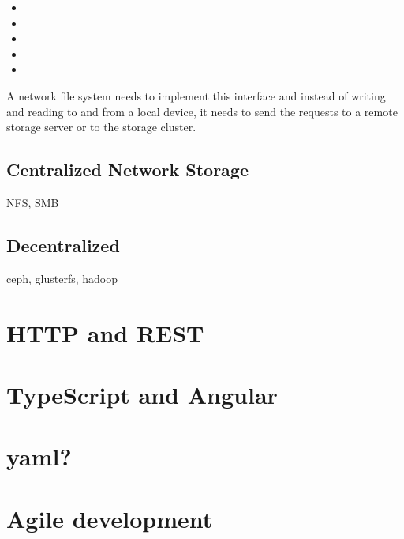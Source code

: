\begin{itemize}
	\item {} 
	\item {} 
	\item {} 
	\item {} 
	\item {} 
\end{itemize} 

A network file system needs to implement this interface and instead of writing and reading to and from a local device, it needs to send the requests to a remote storage server or to the storage cluster.


\subsection{Centralized Network Storage}

NFS, SMB

\subsection{Decentralized}

ceph, glusterfs, hadoop


\section{HTTP and REST}

\section{TypeScript and Angular}

\section{yaml?}


\section{Agile development}
